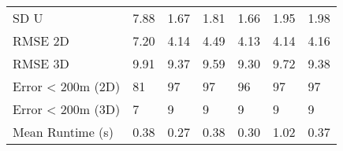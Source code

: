 \begin{longtable}{lllllll}
SD U              &       7.88 &       1.67 &      1.81 &     1.66 &     1.95 &        1.98 \\
RMSE 2D           &       7.20 &       4.14 &      4.49 &     4.13 &     4.14 &        4.16 \\
RMSE 3D           &       9.91 &       9.37 &      9.59 &     9.30 &     9.72 &        9.38 \\
Error < 200m (2D) &         81 &         97 &        97 &       96 &       97 &          97 \\
Error < 200m (3D) &          7 &          9 &         9 &        9 &        9 &           9 \\
Mean Runtime (s)  &       0.38 &       0.27 &      0.38 &     0.30 &     1.02 &        0.37 \\
\end{longtable}
